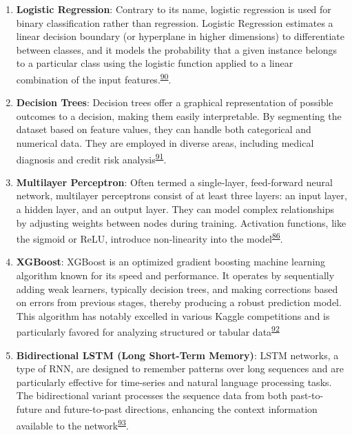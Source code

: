 \documentclass[
  10pt,
]{scrbook}
\let\originaltextbf\textbf
\renewcommand{\textbf}[1]{\textcolor{color1}{\textsf{\originaltextbf{#1}}}}
\begin{document}
\begin{enumerate}
\def\labelenumi{\arabic{enumi}.}
\item
  \textbf{Logistic Regression}: Contrary to its name, logistic
  regression is used for binary classification rather than regression.
  Logistic Regression estimates a linear decision boundary (or
  hyperplane in higher dimensions) to differentiate between classes, and
  it models the probability that a given instance belongs to a
  particular class using the logistic function applied to a linear
  combination of the input
  features.\textsuperscript{\protect\hyperlink{ref-McCullagh_1989}{90}}.
\item
  \textbf{Decision Trees}: Decision trees offer a graphical
  representation of possible outcomes to a decision, making them easily
  interpretable. By segmenting the dataset based on feature values, they
  can handle both categorical and numerical data. They are employed in
  diverse areas, including medical diagnosis and credit risk
  analysis\textsuperscript{\protect\hyperlink{ref-quinlan_1986}{91}}.
\item
  \textbf{Multilayer Perceptron}: Often termed a single-layer,
  feed-forward neural network, multilayer perceptrons consist of at
  least three layers: an input layer, a hidden layer, and an output
  layer. They can model complex relationships by adjusting weights
  between nodes during training. Activation functions, like the sigmoid
  or ReLU, introduce non-linearity into the
  model\textsuperscript{\protect\hyperlink{ref-Goodfellow-et-al-2016}{86}}.
\item
  \textbf{XGBoost}: XGBoost is an optimized gradient boosting machine
  learning algorithm known for its speed and performance. It operates by
  sequentially adding weak learners, typically decision trees, and
  making corrections based on errors from previous stages, thereby
  producing a robust prediction model. This algorithm has notably
  excelled in various Kaggle competitions and is particularly favored
  for analyzing structured or tabular
  data\textsuperscript{\protect\hyperlink{ref-Chen_xgboost_2016}{92}}
\item
  \textbf{Bidirectional LSTM (Long Short-Term Memory)}: LSTM networks, a
  type of RNN, are designed to remember patterns over long sequences and
  are particularly effective for time-series and natural language
  processing tasks. The bidirectional variant processes the sequence
  data from both past-to-future and future-to-past directions, enhancing
  the context information available to the
  network\textsuperscript{\protect\hyperlink{ref-graves_2005}{93}}.
\end{enumerate}
\end{document}
